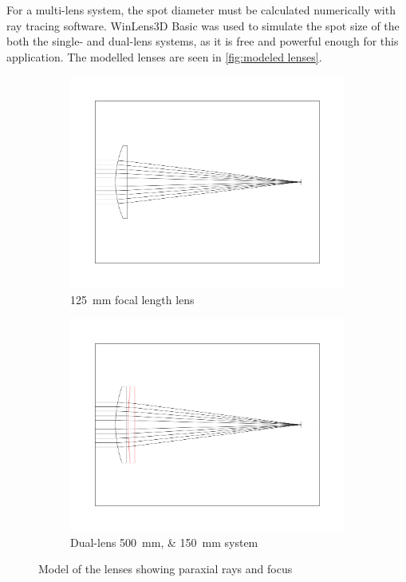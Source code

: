             For a multi-lens system, the spot diameter must be calculated numerically with ray tracing software. WinLens3D Basic was used to simulate the spot size of the both the single- and dual-lens systems, as it is free and powerful enough for this application. The modelled lenses are seen in \autoref{fig:modeled lenses}.
            \begin{figure}[!ht]
                \centering
                \begin{subfigure}[t]{0.45\textwidth}
                    \centering
                    \includegraphics[width=\textwidth]{assets/4 experiments/125lens.pdf}
                    \caption{\qty{125}{mm} focal length lens}
                \end{subfigure}
                \hfill
                \begin{subfigure}[t]{0.45\textwidth}
                    \centering
                    \includegraphics[width=\textwidth]{assets/4 experiments/500 and 150 lenses.pdf}
                    \caption{Dual-lens \qtylist{500;150}{mm} system}
                \end{subfigure}
                \caption{Model of the lenses showing paraxial rays and focus}
                \label{fig:modeled lenses}
            \end{figure}

